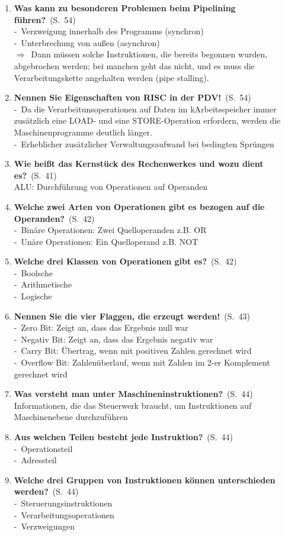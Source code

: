 \documentclass[a4paper,12pt]{article}
\newcommand{\question}[3]{\pagebreak[3]\item {\textbf{#1?}}\ (S.\ #2)#3}
\newcommand{\statement}[3]{\pagebreak[3]\item {\textbf{#1!}}\ (S.\ #2)#3}
\newcommand{\catchword}[1]{\\-\ #1}
\newcommand{\normaltext}[1]{\\#1}
\newcommand{\result}[1]{\\ $\Rightarrow$\ #1}
\newcommand{\page}[1]{#1}
\begin{document}
\begin{enumerate}
  \question{Was kann zu besonderen Problemen beim Pipelining führen}{\page{54}}
  {
    \catchword{Verzweigung innerhalb des Programms (synchron)}
    \catchword{Unterbrechung von außen (asynchron)}
    \result{Dann müssen solche Instruktionen, die bereits begonnen wurden, abgebrochen 
            werden; bei manchen geht das nicht, und es muss die Verarbeitungskette angehalten 
            werden (pipe stalling).}
  }

  \statement{Nennen Sie Eigenschaften von RISC in der PDV}{\page{54}}
  {
    \catchword{Da die Verarbeitunsoperationen auf Daten im kArbeitsspeicher immer zusätzlich
               eine LOAD- und eine STORE-Operation erfordern, werden die Maschinenprogramme
               deutlich länger.}
    \catchword{Erheblicher zusätzlicher Verwaltungsaufwand bei bedingten Sprüngen}
  }

  \question{Wie heißt das Kernstück des Rechenwerkes und wozu dient es}{\page{41}}
  {
    \normaltext{ALU: Durchführung von Operationen auf Operanden}
  }

  \question{Welche zwei Arten von Operationen gibt es bezogen auf die Operanden}{\page{42}}
  {
    \catchword{Binäre Operationen: Zwei Quelloperanden z.B. OR}
    \catchword{Unäre Operationen: Ein Quelloperand z.B. NOT}
  }

  \question{Welche drei Klassen von Operationen gibt es}{\page{42}}
  {
    \catchword{Boolsche}
    \catchword{Arithmetische}
    \catchword{Logische}
  }

  \statement{Nennen Sie die vier Flaggen, die erzeugt werden}{\page{43}}
  {
    \catchword{Zero Bit: Zeigt an, dass das Ergebnis null war}
    \catchword{Negativ Bit: Zeigt an, dass das Ergebnis negativ war}
    \catchword{Carry Bit: Übertrag, wenn mit positiven Zahlen gerechnet wird}
    \catchword{Overflow Bit: Zahlenüberlauf, wenn mit Zahlen im 2-er Komplement gerechnet wird}
  }

  \question{Was versteht man unter Maschineninstruktionen}{\page{44}}
  {
    \normaltext{Informationen, die das Steuerwerk braucht, um Instruktionen auf 
                Maschinenebene durchzuführen}
  }

  \question{Aus welchen Teilen besteht jede Instruktion}{\page{44}}
  {
    \catchword{Operationsteil}
    \catchword{Adressteil}
  }

  \question{Welche drei Gruppen von Instruktionen können unterschieden werden}{\page{44}}
  {
    \catchword{Steruerungsinstruktionen}
    \catchword{Verarbeitungsoperationen}
    \catchword{Verzweigungen}
  }


\end{enumerate}
\end{document}

